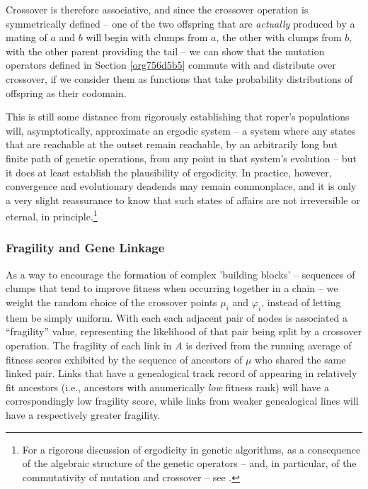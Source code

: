 \documentclass[12pt,glossary]{dalthesis}
\begin{document}
Crossover is therefore associative, and since the crossover operation is symmetrically
defined -- one of the two offspring that are \emph{actually} produced by a mating of \(a\) 
and \(b\) will begin with clumps from \(a\), the other with clumps from \(b\), with the other
parent providing the tail -- we can show that the mutation operators defined in
Section \ref{org756d5b5} commute with and distribute over crossover, if we consider
them as functions that take probability distributions of offspring as their codomain. 

This is still some distance from rigorously establishing that \gls{roper}'s populations
will, asymptotically, approximate an ergodic system -- a system where any states that
are reachable at the outset remain reachable, by an arbitrarily long but
finite path of genetic operations, from any point in that system's evolution -- but
it does at least establish the plausibility of ergodicity. In practice, however,
convergence and evolutionary deadends may remain commonplace, and it is only a very
slight reassurance to know that such states of affairs are not irreversible or 
eternal, in principle.\footnote{For a rigorous discussion of ergodicity in genetic algorithms, as a consequence of the algebraic structure of the genetic operators -- and, in particular, of the commutativity of mutation and crossover -- see \cite{schmitt01}.}


\subsubsection{Fragility and Gene Linkage}
\label{sec:org89f83c4}
\label{orgbce4309}

As a way to encourage the formation of complex 'building blocks' -- sequences of
clumps that tend to improve fitness when occurring together in a chain -- we
weight the random choice of the crossover points \(\mu_i\) and \(\varphi_i\),
instead of letting them be simply uniform. With each each adjacent pair of nodes
is associated a ``fragility'' value, representing the likelihood of that
pair being split by a crossover operation. The fragility of each link in \(A\) is
derived from the running average of fitness scores exhibited by the sequence of
ancestors of \(\mu\) who shared the same linked pair. Links that have a genealogical
track record of appearing in relatively fit ancestors (i.e., ancestors with anumerically 
\emph{low} fitness rank) will have a correspondingly low fragility score, while links
from weaker genealogical lines will have a respectively greater fragility.
\end{document}
